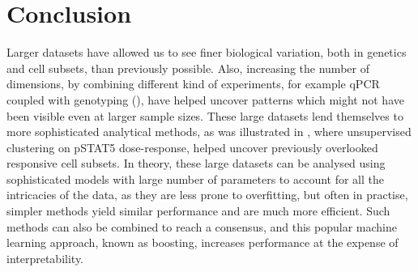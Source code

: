 


\section{Conclusion}


Larger datasets have allowed us to see finer biological variation, both in genetics and cell subsets, than previously possible.
Also, increasing the number of dimensions, by combining different kind of experiments, for example qPCR coupled with genotyping (), have helped uncover patterns which might not have been visible even at larger sample sizes.
These large datasets lend themselves to more sophisticated analytical methods, as was illustrated in , where unsupervised clustering on pSTAT5 dose-response, helped uncover previously overlooked responsive cell subsets.
In theory, these large datasets can be analysed using sophisticated models with large number of parameters to account for all the intricacies of the data, as they are less prone to overfitting, but often in practise, simpler methods yield similar performance and are much more efficient.
Such methods can also be combined to reach a consensus, and this popular machine learning approach, known as boosting, increases performance at the expense of interpretability.

